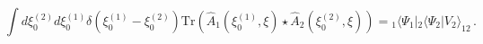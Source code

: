 \begin{equation}
\int d\xi _{0}^{(2)}d\xi _{0}^{(1)}\delta (\xi _{0}^{(1)}-\xi _{0}^{(2)})%
\mathrm{Tr}(\hat{A}_1(\xi _{0}^{(1)},\xi )\star \hat{A}_2(\xi
_{0}^{(2)},\xi ))={}_1\langle \Psi_1|{}_2\langle \Psi_2|V_{2}\rangle_{12}\,.
\label{eq:V2n=2}
\end{equation}

